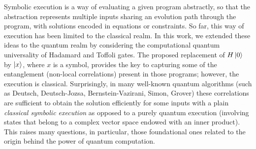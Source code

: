 \documentclass[sigplan,review]{acmart}
\theoremstyle{definition}
\begin{document}
Symbolic execution is a way of evaluating a given program abstractly,
so that the abstraction represents multiple inputs sharing an
evolution path through the program, with solutions encoded in
equations or constraints. So far, this way of execution has been
limited to the classical realm. In this work, we extended these ideas
to the quantum realm by considering the computational quantum
universality of Hadamard and Toffoli gates. The proposed replacement
of $H \ket{0}$ by $\ket{x}$, where $x$ is a symbol, provides the key
to capturing some of the entanglement (non-local correlations) present
in those programs; however, the execution is classical. Surprisingly,
in many well-known quantum algorithms (such as Deutsch, Deutsch-Jozsa,
Bernstein-Vazirani, Simon, Grover) these correlations are sufficient
to obtain the solution efficiently for some inputs with a plain
\emph{classical symbolic execution} as opposed to a purely quantum
execution (involving states that belong to a complex vector space
endowed with an inner product). This raises many questions, in
particular, those foundational ones related to the origin behind the
power of quantum computation.
\end{document}
